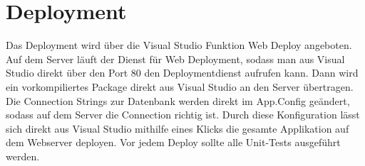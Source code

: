 \chapter{Deployment}
	Das Deployment wird über die Visual Studio Funktion Web Deploy angeboten. Auf dem Server läuft der Dienst für Web Deployment, sodass man aus Visual Studio direkt über den Port 80 den Deploymentdienst aufrufen kann.
	Dann wird ein vorkompiliertes Package direkt aus Visual Studio an den Server übertragen. Die Connection Strings zur Datenbank werden direkt im App.Config geändert, sodass auf dem Server die Connection richtig ist.
	Durch diese Konfiguration lässt sich direkt aus Visual Studio mithilfe eines Klicks die gesamte Applikation auf dem Webserver deployen.
	Vor jedem Deploy sollte alle Unit-Tests ausgeführt werden.